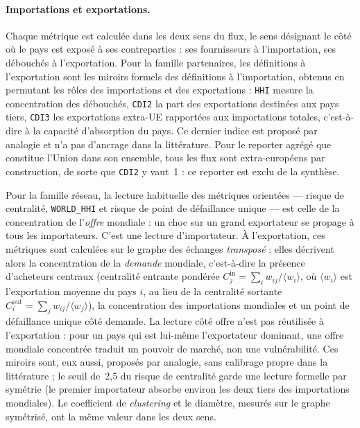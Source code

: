 \documentclass[11pt,a4paper]{article}
\theoremstyle{definition}
\theoremstyle{remark}
\begin{document}
\bigskip

\paragraph{Importations et exportations.} Chaque métrique est calculée dans les deux sens
du flux, le sens désignant le côté où le pays est exposé à ses contreparties : ses
fournisseurs à l'importation, ses débouchés à l'exportation. Pour la famille partenaires,
les définitions à l'exportation sont les miroirs formels des définitions à l'importation,
obtenus en permutant les rôles des importations et des exportations : \texttt{HHI} mesure
la concentration des débouchés, \texttt{CDI2} la part des exportations destinées aux pays
tiers, \texttt{CDI3} les exportations extra-UE rapportées aux importations totales,
c'est-à-dire à la capacité d'absorption du pays. Ce dernier indice est proposé par
analogie et n'a pas d'ancrage dans la littérature. Pour le reporter agrégé que constitue
l'Union dans son ensemble, tous les flux sont extra-européens par construction, de sorte
que \texttt{CDI2} y vaut~1 : ce reporter est exclu de la synthèse.

\medskip

Pour la famille réseau, la lecture habituelle des métriques orientées --- risque de
centralité, \texttt{WORLD\_HHI} et risque de point de défaillance unique --- est celle de
la concentration de l'\emph{offre} mondiale : un choc sur un grand exportateur se propage
à tous les importateurs. C'est une lecture d'importateur. À l'exportation, ces métriques
sont calculées sur le graphe des échanges \emph{transposé} : elles décrivent alors la
concentration de la \emph{demande} mondiale, c'est-à-dire la présence d'acheteurs
centraux (centralité entrante pondérée $C_j^{\text{in}} = \sum_i w_{ij} / \langle w_i
\rangle$, où $\langle w_i \rangle$ est l'exportation moyenne du pays $i$, au lieu de la
centralité sortante $C_i^{\text{out}} = \sum_j w_{ij} / \langle w_j \rangle$),
la concentration des importations mondiales et un point de défaillance unique côté
demande. La lecture côté offre n'est pas réutilisée à l'exportation : pour un pays qui est
lui-même l'exportateur dominant, une offre mondiale concentrée traduit un pouvoir de
marché, non une vulnérabilité. Ces miroirs sont, eux aussi, proposés par analogie, sans
calibrage propre dans la littérature ; le seuil de~2,5 du risque de centralité garde une
lecture formelle par symétrie (le premier importateur absorbe environ les deux tiers des
importations mondiales). Le coefficient de \emph{clustering} et le diamètre, mesurés sur
le graphe symétrisé, ont la même valeur dans les deux sens.
\end{document}
